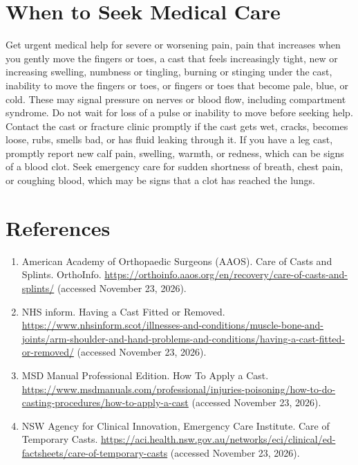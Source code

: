 \section*{When to Seek Medical Care}
Get urgent medical help for severe or worsening pain, pain that increases when you gently move the fingers or toes, a cast that feels increasingly tight, new or increasing swelling, numbness or tingling, burning or stinging under the cast, inability to move the fingers or toes, or fingers or toes that become pale, blue, or cold. These may signal pressure on nerves or blood flow, including compartment syndrome. Do not wait for loss of a pulse or inability to move before seeking help. Contact the cast or fracture clinic promptly if the cast gets wet, cracks, becomes loose, rubs, smells bad, or has fluid leaking through it. If you have a leg cast, promptly report new calf pain, swelling, warmth, or redness, which can be signs of a blood clot. Seek emergency care for sudden shortness of breath, chest pain, or coughing blood, which may be signs that a clot has reached the lungs.

\section*{References}
\begin{enumerate}
  \item American Academy of Orthopaedic Surgeons (AAOS). Care of Casts and Splints. OrthoInfo. \url{https://orthoinfo.aaos.org/en/recovery/care-of-casts-and-splints/} (accessed November 23, 2026).
  \item NHS inform. Having a Cast Fitted or Removed. \url{https://www.nhsinform.scot/illnesses-and-conditions/muscle-bone-and-joints/arm-shoulder-and-hand-problems-and-conditions/having-a-cast-fitted-or-removed/} (accessed November 23, 2026).
  \item MSD Manual Professional Edition. How To Apply a Cast. \url{https://www.msdmanuals.com/professional/injuries-poisoning/how-to-do-casting-procedures/how-to-apply-a-cast} (accessed November 23, 2026).
  \item NSW Agency for Clinical Innovation, Emergency Care Institute. Care of Temporary Casts. \url{https://aci.health.nsw.gov.au/networks/eci/clinical/ed-factsheets/care-of-temporary-casts} (accessed November 23, 2026).
\end{enumerate}

\clearpage
